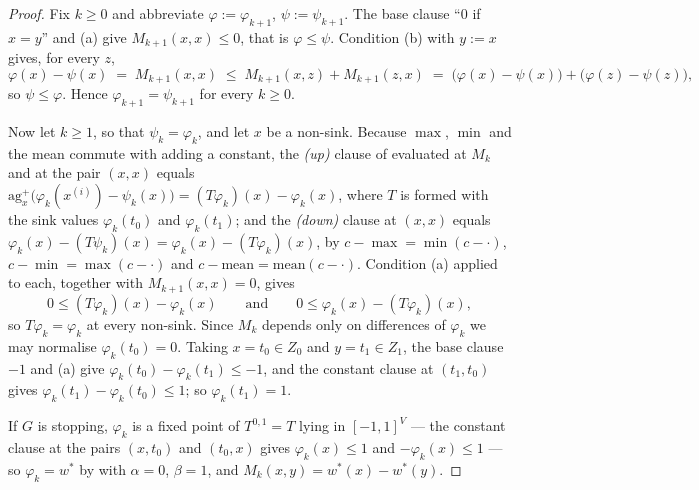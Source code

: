 \documentclass[11pt]{article}
\theoremstyle{plain}
\theoremstyle{definition}
\begin{document}
\begin{proof}
Fix $k\ge0$ and abbreviate $\varphi:=\varphi_{k+1}$, $\psi:=\psi_{k+1}$.
The base clause ``$0$ if $x=y$'' and (a) give $M_{k+1}(x,x)\le0$, that is
$\varphi\le\psi$. Condition (b) with $y:=x$ gives, for every $z$,
\[
  \varphi(x)-\psi(x)\;=\;M_{k+1}(x,x)\;\le\;M_{k+1}(x,z)+M_{k+1}(z,x)
  \;=\;\bigl(\varphi(x)-\psi(x)\bigr)+\bigl(\varphi(z)-\psi(z)\bigr),
\]
so $\psi\le\varphi$. Hence $\varphi_{k+1}=\psi_{k+1}$ for every $k\ge0$.

Now let $k\ge1$, so that $\psi_k=\varphi_k$, and let $x$ be a non-sink.
Because $\max$, $\min$ and the mean commute with adding a constant, the
\emph{(up)} clause of  evaluated at $M_k$ and at the pair
$(x,x)$ equals
$\mathrm{ag}^{+}_{x}\bigl(\varphi_k(x^{(i)})-\psi_k(x)\bigr)
=(T\varphi_k)(x)-\varphi_k(x)$, where $T$ is formed with the sink values
$\varphi_k(t_0)$ and $\varphi_k(t_1)$; and the \emph{(down)} clause at
$(x,x)$ equals $\varphi_k(x)-(T\psi_k)(x)=\varphi_k(x)-(T\varphi_k)(x)$,
by $c-\max=\min(c-\cdot)$, $c-\min=\max(c-\cdot)$ and
$c-\mathrm{mean}=\mathrm{mean}(c-\cdot)$. Condition (a) applied to each,
together with $M_{k+1}(x,x)=0$, gives
\[
  0\le(T\varphi_k)(x)-\varphi_k(x)
  \qquad\text{and}\qquad
  0\le\varphi_k(x)-(T\varphi_k)(x),
\]
so $T\varphi_k=\varphi_k$ at every non-sink. Since $M_k$ depends only on
differences of $\varphi_k$ we may normalise $\varphi_k(t_0)=0$. Taking
$x=t_0\in Z_0$ and $y=t_1\in Z_1$, the base clause $-1$ and (a) give
$\varphi_k(t_0)-\varphi_k(t_1)\le-1$, and the constant clause at
$(t_1,t_0)$ gives $\varphi_k(t_1)-\varphi_k(t_0)\le1$; so
$\varphi_k(t_1)=1$.

If $G$ is stopping, $\varphi_k$ is a fixed point of $T^{0,1}=T$ lying in
$[-1,1]^{V}$ --- the constant clause at the pairs $(x,t_0)$ and
$(t_0,x)$ gives $\varphi_k(x)\le1$ and $-\varphi_k(x)\le1$ ---
so $\varphi_k=w^\ast$ by  with $\alpha=0$,
$\beta=1$, and $M_k(x,y)=w^\ast(x)-w^\ast(y)$.
\end{proof}
\end{document}
